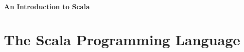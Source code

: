\documentclass[a4paper,12pt,twoside,titlepage]{book}
\newcommand{\langname}[1]{#1\xspace}
\newcommand{\Scala}{\langname{Scala}}
\begin{document}
\frontmatter
\makedoctitle
\clearemptydoublepage
\tableofcontents
\mainmatter

\begin{center}
\LARGE\textbf{\\ An Introduction to \Scala}
\end{center}

\setcounter{secnumdepth}{-1}

\section{The \Scala Programming Language}


\end{document}
